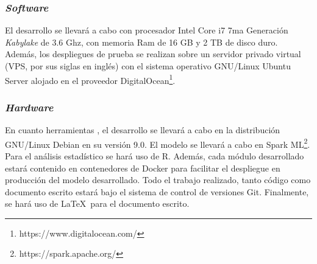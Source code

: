 \subsubsection*{\textit{Software}}
El desarrollo se llevará a cabo con procesador Intel Core i7 7ma Generación \textit{Kabylake} de 3.6 Ghz, con memoria Ram de 16 GB y 2 TB de disco duro. Además, los despliegues de prueba se realizan sobre un servidor privado virtual (VPS, por sus siglas en inglés) con el sistema operativo GNU/Linux Ubuntu Server alojado en el proveedor DigitalOcean\footnote{https://www.digitalocean.com/}.

\subsubsection*{\textit{Hardware}}
En cuanto herramientas , el desarrollo se llevará a cabo en la distribución GNU/Linux Debian en su versión 9.0. El modelo se llevará a cabo en Spark ML\footnote{https://spark.apache.org/}. Para el análisis estadístico se hará uso de R. Además, cada módulo desarrollado estará contenido en contenedores de Docker para facilitar el despliegue en producción del modelo desarrollado. Todo el trabajo realizado, tanto código como documento escrito estará bajo el sistema de control de versiones Git. Finalmente, se hará uso de \LaTeX\ para el documento escrito.
